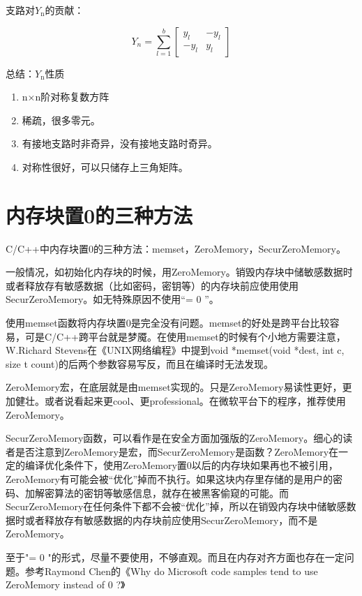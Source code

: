 \documentclass{ctexart} %
\begin{document}
支路对$Y_{\mathrm{n}}$的贡献：

\begin{equation}
Y_{n}=\sum_{l=1}^{b} \left[ \begin{array}{cc}{y_{l}} & {-y_{l}} \\ {-y_{l}} & {y_{l}}\end{array}\right]
\end{equation}

总结：$Y_{\mathrm{n}}$性质
\begin{enumerate}
\item n×n阶对称复数方阵
\item 稀疏，很多零元。
\item 有接地支路时非奇异，没有接地支路时奇异。
\item 对称性很好，可以只储存上三角矩阵。
\end{enumerate}

\section{内存块置0的三种方法}

C/C++中内存块置0的三种方法：memset，ZeroMemory，SecurZeroMemory\cite{CN}。

一般情况，如初始化内存块的时候，用ZeroMemory。销毁内存块中储敏感数据时或者释放存有敏感数据（比如密码，密钥等）的内存块前应使用使用SecurZeroMemory。如无特殊原因不使用“={ 0 }”。

使用memset函数将内存块置0是完全没有问题。memset的好处是跨平台比较容易，可是C/C++跨平台就是梦魇。在使用memset的时候有个小地方需要注意，W.Richard Stevens在《UNIX网络编程》中提到void *memset(void *dest, int c, size t count)的后两个参数容易写反，而且在编译时无法发现。

ZeroMemory宏，在底层就是由memset实现的。只是ZeroMemory易读性更好，更加健壮。或者说看起来更cool、更professional。在微软平台下的程序，推荐使用ZeroMemory。

SecurZeroMemory函数，可以看作是在安全方面加强版的ZeroMemory。细心的读者是否注意到ZeroMemory是宏，而SecurZeroMemory是函数？ZeroMemory在一定的编译优化条件下，使用ZeroMemory置0以后的内存块如果再也不被引用，ZeroMemory有可能会被“优化”掉而不执行。如果这块内存里存储的是用户的密码、加解密算法的密钥等敏感信息，就存在被黑客偷窥的可能。而SecurZeroMemory在任何条件下都不会被“优化”掉，所以在销毁内存块中储敏感数据时或者释放存有敏感数据的内存块前应使用SecurZeroMemory，而不是ZeroMemory。

至于"={ 0 }"的形式，尽量不要使用，不够直观。而且在内存对齐方面也存在一定问题。参考Raymond Chen的《Why do Microsoft code samples tend to use ZeroMemory instead of { 0 }?》
\end{document}
